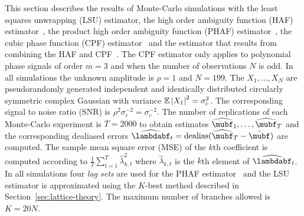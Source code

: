 \documentclass[journal]{IEEEtran}
\begin{document}

This section describes the results of Monte-Carlo simulations with the least squares unwrapping (LSU) estimator, the high order ambiguity function (HAF) estimator~\cite{Peleg_DPT_1995}, the product high order ambiguity function (PHAF) estimator~\cite{Barbarossa_PHAF_1998}, the cubic phase function (CPF) estimator~\cite{Oshea_cpf_2004} and the estimator that results from combining the HAF and CPF~\cite{Djurovic_haf_cpf_2012}.  The CPF estimator only applies to polynomial phase signals of order $m=3$ and when the number of observations $N$ is odd.  In all simulations the unknown amplitude is $\rho = 1$ and $N = 199$.  The $X_1, \dots, X_N$ are pseudorandomly generated independent and identically distributed circularly symmetric complex Gaussian with variance ${\mathbb E}\left\vert X_1 \right\vert^2 = \sigma_c^2$.  The corresponding signal to noise ratio (SNR) is $\rho^2 \sigma_c^{-2} = \sigma_c^{-2}$.  The number of replications of each Monte-Carlo experiment is $T = 2000$ to obtain estimates $\widehat{\mubf}_1, \dots, \widehat{\mubf}_T$ and the corresponding dealiased errors $\widehat{\lambdabf}_t = \dealias(\widehat{\mubf}_T - \tilde{\mubf})$ are computed.  The sample mean square error (MSE) of the $k$th coefficient is computed according to $\tfrac{1}{T}\sum_{t=1}^T \widehat{\lambda}_{k,t}^2$ where $\widehat{\lambda}_{k,t}$ is the $k$th element of $\widehat{\lambdabf}_t$.  In all simulations four \emph{lag sets} are used for the PHAF estimator~\cite{Barbarossa_PHAF_1998} and the LSU estimator is approximated using the $K$-best method described in Section~\ref{sec:lattice-theory}.  The maximum number of branches allowed is $K=20N$.
\end{document}
